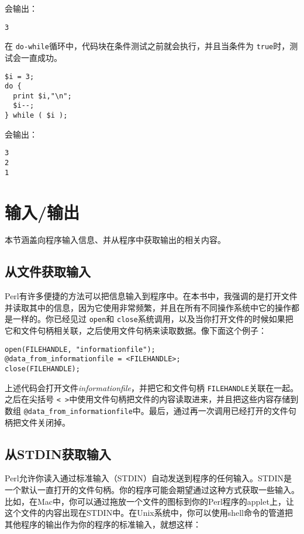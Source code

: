 会输出：

\begin{lstlisting}
3
\end{lstlisting}

在 \verb|do-while|循环中，代码块在条件测试之前就会执行，并且当条件为 \verb|true|时，测试会一直成功。

\begin{lstlisting}
$i = 3;
do {
  print $i,"\n";
  $i--;
} while ( $i );
\end{lstlisting}

会输出：

\begin{lstlisting}
3
2
1
\end{lstlisting}

\section{输入/输出}
本节涵盖向程序输入信息、并从程序中获取输出的相关内容。

\subsection{从文件获取输入}
Perl有许多便捷的方法可以把信息输入到程序中。在本书中，我强调的是打开文件并读取其中的信息，因为它使用非常频繁，并且在所有不同操作系统中它的操作都是一样的。你已经见过 \verb|open|和 \verb|close|系统调用，以及当你打开文件的时候如果把它和文件句柄相关联，之后使用文件句柄来读取数据。像下面这个例子：

\begin{lstlisting}
open(FILEHANDLE, "informationfile");
@data_from_informationfile = <FILEHANDLE>;
close(FILEHANDLE);
\end{lstlisting}

上述代码会打开文件\textit{informationfile}，并把它和文件句柄 \verb|FILEHANDLE|关联在一起。之后在尖括号 \verb|< >|中使用文件句柄把文件的内容读取进来，并且把这些内容存储到数组 \verb|@data_from_informationfile|中。最后，通过再一次调用已经打开的文件句柄把文件关闭掉。

\subsection{从STDIN获取输入}
Perl允许你读入通过标准输入（STDIN）自动发送到程序的任何输入。STDIN是一个默认一直打开的文件句柄。你的程序可能会期望通过这种方式获取一些输入。比如，在Mac中，你可以通过拖放一个文件的图标到你的Perl程序的applet上，让这个文件的内容出现在STDIN中。在Unix系统中，你可以使用shell命令的管道把其他程序的输出作为你的程序的标准输入，就想这样：

